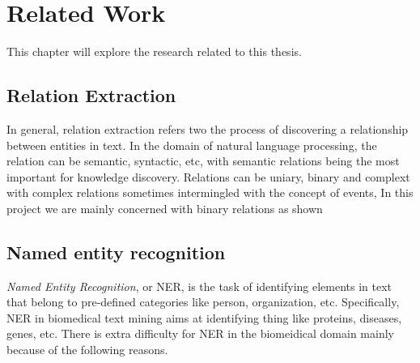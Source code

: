 \chapter{Related Work}  %

\ifpdf
    \graphicspath{{Background/Figs/Raster/}{Background/Figs/PDF/}{Background/Figs/}}
\else
    \graphicspath{{Background/Figs/Vector/}{Background/Figs/}}
\fi

This chapter will explore the research related to this thesis. 

\section{Relation Extraction} %
In general, relation extraction refers two the process of discovering a relationship between entities in text. In the domain of natural language processing, the relation can be semantic, syntactic, etc, with semantic relations being the most important for knowledge discovery. Relations can be uniary, binary and complext with complex relations sometimes intermingled with the concept of events, In this project we are mainly concerned with binary relations as shown

\section{Named entity recognition}
\emph{Named Entity Recognition}, or NER, is the task of identifying elements in text that belong to pre-defined categories like person, organization, etc. Specifically, NER in biomedical text mining aims at identifying thing like proteins, diseases, genes, etc. There is extra difficulty for NER in the biomeidical domain mainly because of the following reasons. 

